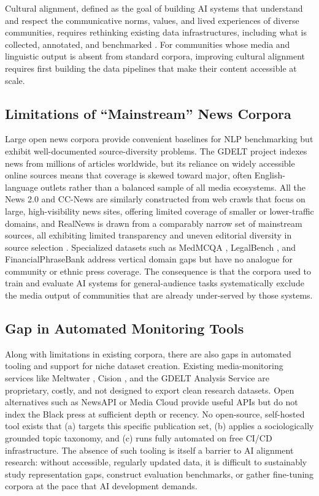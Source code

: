 \documentclass[letterpaper]{article}
\begin{document}
Cultural alignment, defined as the goal of building AI systems that
understand and respect the communicative norms, values, and lived
experiences of diverse communities, requires rethinking existing data
infrastructures, including what is collected, annotated, and
benchmarked \citep{hershcovich2022}. For communities whose media and
linguistic output is absent from standard corpora, improving cultural
alignment requires first building the data pipelines that make their
content accessible at scale.

\subsection{Limitations of ``Mainstream'' News Corpora}

Large open news corpora provide convenient baselines for NLP
benchmarking but exhibit well-documented source-diversity problems. The
GDELT project \citep{gdelt2026} indexes news from millions of articles
worldwide, but its reliance on widely accessible online sources means
that coverage is skewed toward major, often English-language outlets
rather than a balanced sample of all media ecosystems. All the News 2.0
\citep{thompson2020} and CC-News \citep{mackenzie2020} are similarly
constructed from web crawls that focus on large, high-visibility news
sites, offering limited coverage of smaller or lower-traffic domains,
and RealNews \citep{zellers2019} is drawn from a comparably narrow set
of mainstream sources, all exhibiting limited transparency and uneven
editorial diversity in source selection \citep{gruppi2020}. Specialized
datasets such as MedMCQA \citep{pal2022}, LegalBench \citep{guha2023},
and FinancialPhraseBank \citep{malo2014} address vertical domain gaps
but have no analogue for community or ethnic press coverage. The
consequence is that the corpora used to train and evaluate AI systems
for general-audience tasks systematically exclude the media output of
communities that are already under-served by those systems.

\subsection{Gap in Automated Monitoring Tools}

Along with limitations in existing corpora, there are also gaps in
automated tooling and support for niche dataset creation. Existing
media-monitoring services like Meltwater \citep{meltwater2026}, Cision
\citep{cision2024}, and the GDELT Analysis Service
\citep{gdeltanalysis2025} are proprietary, costly, and not designed to
export clean research datasets. Open alternatives such as NewsAPI
\citep{newsapi2026} or Media Cloud \citep{mediacloud2020} provide useful
APIs but do not index the Black press at sufficient depth or recency. No
open-source, self-hosted tool exists that (a) targets this specific
publication set, (b) applies a sociologically grounded topic taxonomy,
and (c) runs fully automated on free CI/CD infrastructure. The absence
of such tooling is itself a barrier to AI alignment research: without
accessible, regularly updated data, it is difficult to sustainably study
representation gaps, construct evaluation benchmarks, or gather
fine-tuning corpora at the pace that AI development demands.
\end{document}
